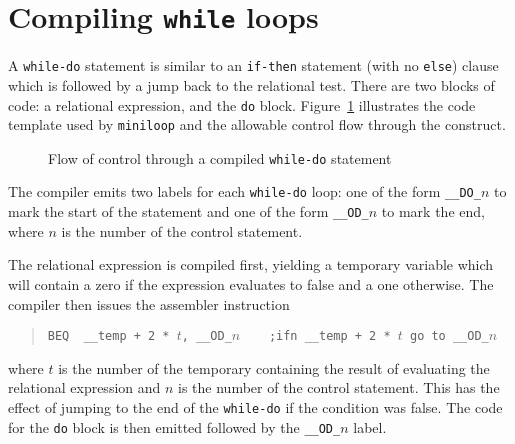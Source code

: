 \section{Compiling {\tt while} loops}
A {\tt while-do} statement is similar to an {\tt if-then} statement (with no {\tt else}) clause
which is followed by a jump back to the relational test. There are two blocks of code:
a relational expression,
and the {\tt do} block. Figure~\ref{while:statement} illustrates the
code template used by {\tt miniloop} and the allowable control flow through the construct.
\begin{figure}
\begin{center}

\end{center}
\caption{Flow of control through a compiled {\tt while-do} statement}
\label{while:statement}
\end{figure}

The compiler emits two labels for each {\tt while-do} loop: one of the form \verb|__DO_|$n$
to mark the start of the statement and one of the form \verb|__OD_|$n$ to mark the end, where
$n$ is the number of the control statement. 

The relational expression is compiled first, yielding a temporary variable which will contain
a zero if the expression evaluates to {\sc false} and a one otherwise. The compiler then
issues the assembler instruction
\begin{quote}
\verb|BEQ  __temp + 2 * |$t$\verb|, __OD_|$n$\verb|    ;ifn __temp + 2 * |$t$\verb| go to __OD_|$n$ 
\end{quote}
where $t$ is the number of the temporary containing the result of evaluating the relational
expression and $n$ is the number of the control statement. This has the effect of jumping to the
end of the {\tt while-do} if the condition was false. The code for the {\tt do} block is then
emitted followed by the \verb|__OD_|$n$ label.

